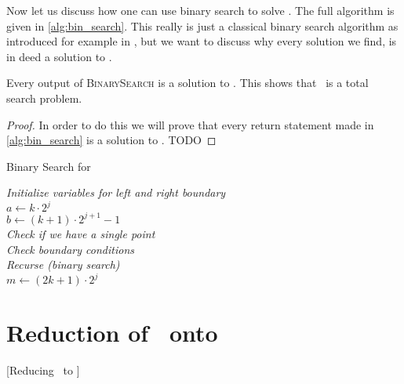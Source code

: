 Now let us discuss how one can use binary search to solve \SOL.
The full algorithm is given in \cref{alg:bin_search}.
This really is just a classical binary search algorithm as introduced for example in , but we want to discuss why every solution we
find, is in deed a solution to \SOL.
\begin{claim}
    Every output of \textsc{BinarySearch} is a solution to \SOL. This shows that \SOL\ is a total search problem.
\end{claim}
\begin{proof}
    In order to do this we will prove that every return statement made in \cref{alg:bin_search} is a solution to \SOL.
    TODO
\end{proof}

\begin{algorithm}[!hbt]
    \caption{Binary Search for \SOL}\label{alg:bin_search}


    \emph{Initialize variables for left and right boundary}\\
    $a \longleftarrow k \cdot 2^j$ \\
    $b \longleftarrow (k+1) \cdot 2^{j+1} - 1$\\

    \emph{Check if we have a single point} \\
    \emph{Check boundary conditions} \\
    \emph{Recurse (binary search)} \\
    $m \longleftarrow (2k + 1) \cdot 2^j$ \\
\end{algorithm}

\section{Reduction of \SOL\ onto \EOPL}[Reducing \SOL\ to \EOPL]

